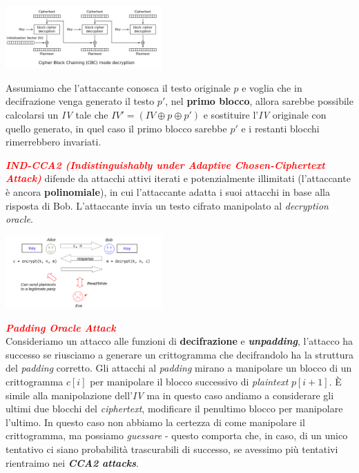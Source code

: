 \begin{flushleft}
    {\centering
        \includegraphics[width=0.45\textwidth]{img/ind_cca1_cbc.png}
    \par}

    Assumiamo che l'attaccante conosca il testo originale $p$ e voglia che in decifrazione venga generato il testo $p'$, nel \textbf{primo blocco}, allora sarebbe possibile calcolarsi un \textit{IV} tale che $IV' = (IV \oplus p \oplus p')$ e sostituire l'\textit{IV} originale con quello generato, in quel caso il primo blocco sarebbe $p'$ e i restanti blocchi rimerrebbero invariati.

    \medskip

    \textcolor{red}{\textbf{\textit{IND-CCA2 (Indistinguishably under Adaptive Chosen-Ciphertext Attack)}}} difende da attacchi attivi iterati e potenzialmente illimitati (l'attaccante è ancora \textbf{polinomiale}), in cui l'attaccante adatta i suoi attacchi in base alla risposta di Bob. L'attaccante invia un testo cifrato manipolato al \textit{decryption oracle}.

    {\centering
        \includegraphics[width=0.45\textwidth]{img/ind_cca2.png}
    \par}
\end{flushleft}

\begin{boxA}
    \textcolor{red}{\textbf{\textit{Padding Oracle Attack}}} \\
    Consideriamo un attacco alle funzioni di \textbf{decifrazione} e \textbf{\textit{unpadding}}, l'attacco ha successo se riusciamo a generare un crittogramma che decifrandolo ha la struttura del \textit{padding} corretto. Gli attacchi al \textit{padding} mirano a manipolare un blocco di un crittogramma $c[i]$ per manipolare il blocco successivo di \textit{plaintext} $p[i+1]$. È simile alla manipolazione dell'\textit{IV} ma in questo caso andiamo a considerare gli ultimi due blocchi del \textit{ciphertext}, modificare il penultimo blocco per manipolare l'ultimo. In questo caso non abbiamo la certezza di come manipolare il crittogramma, ma possiamo \textit{guessare} - questo comporta che, in caso, di un unico tentativo ci siano probabilità trascurabili di successo, se avessimo più tentativi rientraimo nei \textbf{\textit{CCA2 attacks}}.
\end{boxA}

